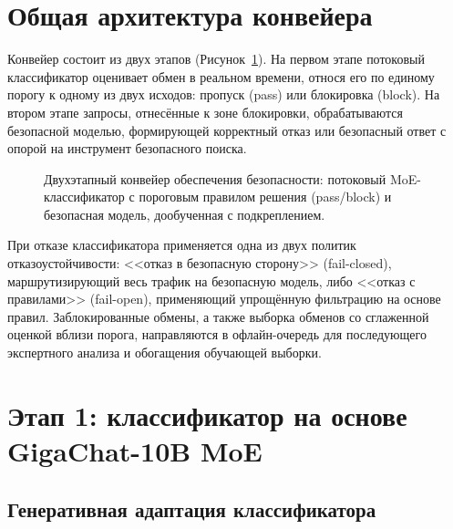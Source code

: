 \section{Общая архитектура конвейера}\label{sec:sp_architecture}

Конвейер состоит из двух этапов (Рисунок~\ref{fig:safety_pipeline}).
На первом этапе потоковый классификатор оценивает обмен в реальном времени, относя его по единому порогу к одному из двух исходов: пропуск (pass) или блокировка (block).
На втором этапе запросы, отнесённые к зоне блокировки, обрабатываются безопасной моделью, формирующей корректный отказ или безопасный ответ с опорой на инструмент безопасного поиска.

\begin{figure}[htbp]
    \centering
    \resizebox{0.97\textwidth}{!}{
        
    }
    \caption{Двухэтапный конвейер обеспечения безопасности: потоковый MoE-классификатор с пороговым правилом решения (pass/block) и безопасная модель, дообученная с подкреплением.}
    \label{fig:safety_pipeline}
\end{figure}

При отказе классификатора применяется одна из двух политик отказоустойчивости: <<отказ в безопасную сторону>> (fail-closed), маршрутизирующий весь трафик на безопасную модель, либо <<отказ с правилами>> (fail-open), применяющий упрощённую фильтрацию на основе правил.
Заблокированные обмены, а также выборка обменов со сглаженной оценкой вблизи порога, направляются в офлайн-очередь для последующего экспертного анализа и обогащения обучающей выборки.

\section{Этап 1: классификатор на основе GigaChat-10B MoE}\label{sec:sp_stage1}

\subsection{Генеративная адаптация классификатора}\label{subsec:sp_generative}

